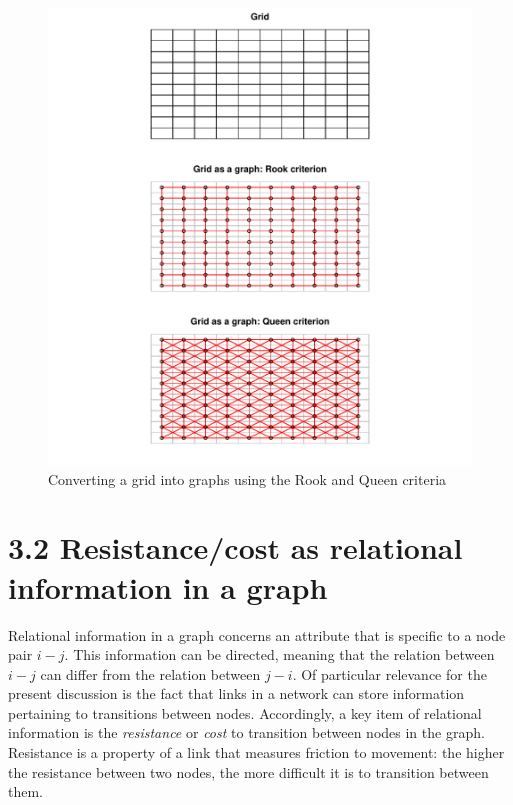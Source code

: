 \documentclass[]{elsarticle} %
\makeatletter
\def\maxwidth{\ifdim\Gin@nat@width>\linewidth\linewidth
\else\Gin@nat@width\fi}
\let\Oldincludegraphics\includegraphics
\renewcommand{\includegraphics}[1]{\Oldincludegraphics[width=\maxwidth]{#1}}
\makeatother
\begin{document}
\begin{figure}
\centering
\includegraphics{Cost-Functions-for-Walking-Accessibility_files/figure-latex/figure-grid-as-graph-1.pdf}
\caption{\label{fig:figure-grid-as-graph}Converting a grid into graphs
using the Rook and Queen criteria}
\end{figure}

\hypertarget{resistancecost-as-relational-information-in-a-graph}{%
\section{3.2 Resistance/cost as relational information in a
graph}\label{resistancecost-as-relational-information-in-a-graph}}

Relational information in a graph concerns an attribute that is specific
to a node pair \(i-j\). This information can be directed, meaning that
the relation between \(i-j\) can differ from the relation between
\(j-i\). Of particular relevance for the present discussion is the fact
that links in a network can store information pertaining to transitions
between nodes. Accordingly, a key item of relational information is the
\emph{resistance} or \emph{cost} to transition between nodes in the
graph. Resistance is a property of a link that measures friction to
movement: the higher the resistance between two nodes, the more
difficult it is to transition between them.
\end{document}
